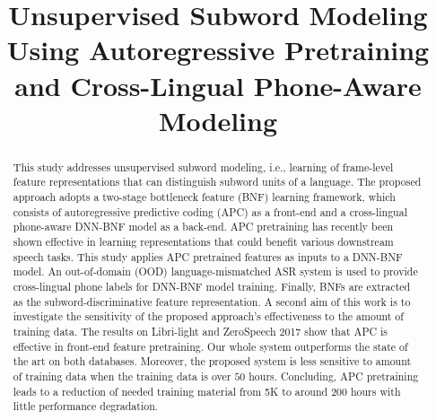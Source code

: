 \documentclass[a4paper]{article}
\title{Unsupervised Subword Modeling Using Autoregressive Pretraining and Cross-Lingual Phone-Aware Modeling}
\begin{document}
\maketitle
% 
\begin{abstract}
This study addresses unsupervised subword modeling, i.e., learning of frame-level feature representations that can distinguish subword units of a language. 
The proposed approach adopts a two-stage bottleneck feature (BNF) learning framework, which consists of 
autoregressive predictive coding (APC) as a front-end  and a cross-lingual phone-aware DNN-BNF model as a back-end. APC pretraining has recently been shown effective in learning representations that 
{\color{blue} could benefit}
various downstream speech tasks. This study applies APC pretrained features as inputs to a DNN-BNF model. An out-of-domain (OOD) language-mismatched ASR system is used to provide cross-lingual phone labels for DNN-BNF model training. Finally, BNFs are extracted as the subword-discriminative feature representation. A second aim of this work is to investigate the sensitivity of the proposed approach's effectiveness to the amount of training data. The results on Libri-light and ZeroSpeech 2017 show that APC is effective in front-end feature pretraining.
Our whole system outperforms the state of the art on both databases. 
Moreover, the proposed system is less sensitive to amount of training data when the training data is over $50$ hours.  
Concluding, APC pretraining leads to a reduction of needed training material from 5K to around 200 hours with little performance degradation.



\end{abstract}
\end{document}
